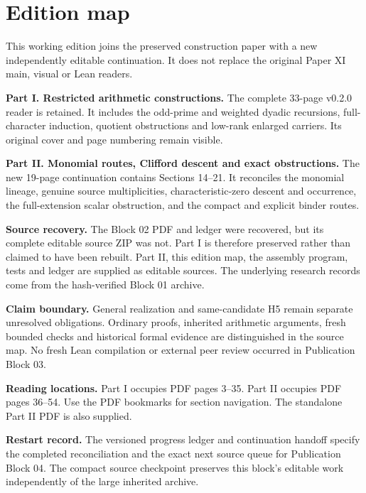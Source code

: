 \documentclass[11pt]{article}
\begin{document}
\KomorebiCover
\section*{Edition map}
This working edition joins the preserved construction paper with a new independently editable continuation. It does not replace the original Paper XI main, visual or Lean readers.

\textbf{Part I. Restricted arithmetic constructions.} The complete 33-page v0.2.0 reader is retained. It includes the odd-prime and weighted dyadic recursions, full-character induction, quotient obstructions and low-rank enlarged carriers. Its original cover and page numbering remain visible.

\textbf{Part II. Monomial routes, Clifford descent and exact obstructions.} The new 19-page continuation contains Sections 14--21. It reconciles the monomial lineage, genuine source multiplicities, characteristic-zero descent and occurrence, the full-extension scalar obstruction, and the compact and explicit binder routes.

\textbf{Source recovery.} The Block 02 PDF and ledger were recovered, but its complete editable source ZIP was not. Part I is therefore preserved rather than claimed to have been rebuilt. Part II, this edition map, the assembly program, tests and ledger are supplied as editable sources. The underlying research records come from the hash-verified Block 01 archive.

\textbf{Claim boundary.} General realization and same-candidate H5 remain separate unresolved obligations. Ordinary proofs, inherited arithmetic arguments, fresh bounded checks and historical formal evidence are distinguished in the source map. No fresh Lean compilation or external peer review occurred in Publication Block 03.

\textbf{Reading locations.} Part I occupies PDF pages 3--35. Part II occupies PDF pages 36--54. Use the PDF bookmarks for section navigation. The standalone Part II PDF is also supplied.

\textbf{Restart record.} The versioned progress ledger and continuation handoff specify the completed reconciliation and the exact next source queue for Publication Block 04. The compact source checkpoint preserves this block's editable work independently of the large inherited archive.
\end{document}
